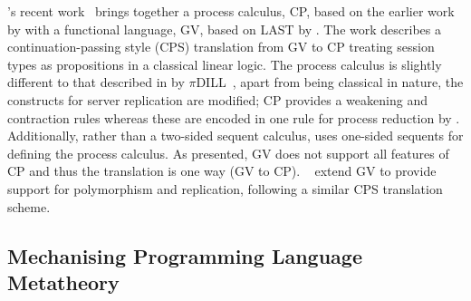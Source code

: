 \documentclass{mprop}
\newcommand{\1}{\textbf{1}\xspace}
\begin{document}
\citeauthor{Wadler:2012}'s recent work~\cite{Wadler:2012} brings together a process calculus, CP, based on the earlier work by \citeauthor{Caires:2010:STI} with a functional language, GV, based on LAST by \citeauthor{Gay:2010:LAST}. The work describes a continuation-passing style (CPS) translation from GV to CP treating session types as propositions in a classical linear logic. The process calculus is slightly different to that described in by $\pi$DILL~\cite{Caires:2010:STI}, apart from being classical in nature, the constructs for server replication are modified; CP provides a weakening and contraction rules whereas these are encoded in one rule for process reduction by \citeauthor{Caires:2010:STI}. Additionally, rather than a two-sided sequent calculus, \citeauthor{Wadler:2012} uses one-sided sequents for defining the process calculus. As presented, GV does not support all features of CP and thus the translation is one way (GV to CP). \citeauthor{Lindley:2014:SAP}~\cite{Lindley:2014:SAP} extend GV to provide support for polymorphism and replication, following a similar CPS translation scheme.


\subsection{Mechanising Programming Language Metatheory}
\end{document}
